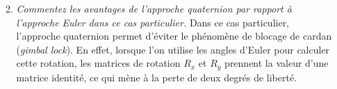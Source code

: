 \documentclass[a4paper,12pt]{article}
\begin{document}
\begin{enumerate}
\begin{enumerate}
\begin{equation}
              \end{equation}
              \item \emph{Commentez les avantages de l’approche quaternion par rapport à l’approche Euler dans ce cas particulier.} \newline \newline
              Dans ce cas particulier, l'approche quaternion permet d'éviter le phénomène de blocage de cardan (\emph{gimbal lock}). En effet, lorsque l'on utilise les angles d'Euler pour calculer cette rotation, les matrices de rotation $R_x$ et $R_y$ prennent la valeur d'une matrice identité, ce qui mène à la perte de deux degrés de liberté.
          \end{enumerate}
\end{enumerate}


\end{document}

